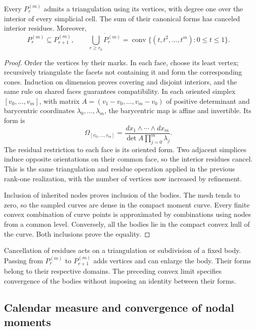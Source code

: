 \begin{proposition}
\label{prop:dim-polytopes}
Every \(P_r^{(m)}\) admits a triangulation using its vertices, with
degree one over the interior of every simplicial cell. The sum of
their canonical forms has canceled interior residues. Moreover,
\[
 P_r^{(m)}\subseteq P_{r+1}^{(m)},\qquad
 \overline{\bigcup_{r\geq r_0}P_r^{(m)}}=
 \operatorname{conv}\{(t,t^2,\ldots,t^m):0\leq t\leq1\}.
\]
\end{proposition}
\begin{proof}
Order the vertices by their marks. In each face, choose its least
vertex; recursively triangulate the facets not containing it and form
the corresponding cones. Induction on dimension proves covering and
disjoint interiors, and the same rule on shared faces guarantees
compatibility. In each oriented simplex \([v_0,\ldots,v_m]\), with
matrix \(A=(v_1-v_0,\ldots,v_m-v_0)\) of positive determinant and
barycentric coordinates \(\lambda_0,\ldots,\lambda_m\), the
barycentric map is affine and invertible. Its form is
\[
 \Omega_{[v_0,\ldots,v_m]}=
 \frac{dx_1\wedge\cdots\wedge dx_m}
 {\det A\prod_{j=0}^{m}\lambda_j}.
\]
The residual restriction to each face is its oriented form. Two
adjacent simplices induce opposite orientations on their common face,
so the interior residues cancel. This is the same triangulation and
residue operation applied in the previous rank-one realization, with
the number of vertices now increased by refinement.

Inclusion of inherited nodes proves inclusion of the bodies. The mesh
tends to zero, so the sampled curves are dense in the compact moment
curve. Every finite convex combination of curve points is approximated
by combinations using nodes from a common level. Conversely, all the
bodies lie in the compact convex hull of the curve. Both inclusions
prove the equality.
\end{proof}

Cancellation of residues acts on a triangulation or subdivision of a
fixed body. Passing from \(P_r^{(m)}\) to \(P_{r+1}^{(m)}\)
adds vertices and can enlarge the body. Their forms belong to their
respective domains. The preceding convex limit specifies convergence
of the bodies without imposing an identity between their forms.

\subsection{Calendar measure and convergence of nodal moments}

